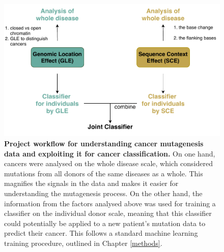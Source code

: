 \begin{figure}[h!]
    \centering
    \includegraphics[scale=0.9]{graphics/workflow.pdf}
    \caption{\textbf{Project workflow for understanding cancer mutagenesis data and exploiting it for cancer classification.} On one hand, cancers were analysed on the whole disease scale, which considered mutations from all donors of the same diseases as a whole. This magnifies the signals in the data and makes it easier for understanding the mutagenesis process. On the other hand, the information from the factors analysed above was used for training a classifier on the individual donor scale, meaning that this classifier could potentially be applied to a new patient's mutation data to predict their cancer. This follows a standard machine learning training procedure, outlined in Chapter \ref{methods}.}
    \label{fig:workflow}
\end{figure}

